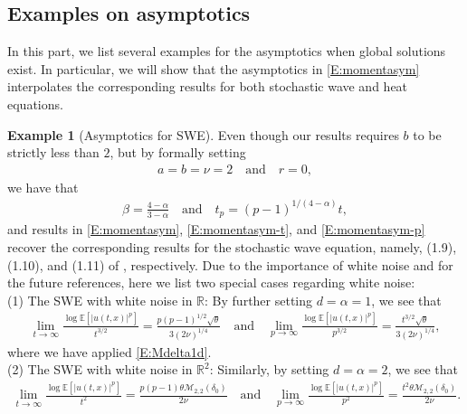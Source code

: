 \documentclass[a4paper,11pt]{article}
\numberwithin{equation}{section}
\numberwithin{equation}{section}
\theoremstyle{plain}
\theoremstyle{definition}
\newtheorem{example}[theorem]{Example}
\newcommand{\E}{\mathbb{E}}
\newcommand{\R}{\mathbb{R}}
\begin{document}
\subsection{Examples on asymptotics} \label{SS:EgAsym}

In this part, we list several examples for the asymptotics when global solutions exist. In
particular, we will show that the asymptotics in \eqref{E:momentasym} interpolates the corresponding
results for both stochastic wave and heat equations.

\begin{example}[Asymptotics for SWE] \label{Eg:AsymSWE}
  Even though our results requires $b$ to be strictly less than $2$, but by formally setting
  \begin{align*}
    a = b = \nu = 2 \quad \text{and} \quad r = 0,
  \end{align*}
  we have that
  \begin{align*}
    \beta = \frac{4-\alpha}{3-\alpha} \quad \text{and} \quad
    t_p   = (p-1)^{1/(4-\alpha)} t,
  \end{align*}
  and results in \eqref{E:momentasym}, \eqref{E:momentasym-t}, and \eqref{E:momentasym-p} recover
  the corresponding results for the stochastic wave equation, namely, (1.9), (1.10), and (1.11) of
  \cite{BCC21}, respectively.  Due to the importance of white noise and for the future references,
  here we list two special cases regarding white noise:\\

  \noindent(1) The SWE with white noise in $\R$: By further setting $d=\alpha=1$, we see that
  \begin{align} \label{E:AsymSWE-1d}
      \lim_{t \to \infty} \frac{\log \E\left[|u(t,x)|^p\right]}{t^{3/2}} =  \frac{p(p-1)^{1/2}\sqrt{\theta}}{3 (2\nu)^{1/4}}
      \quad \text{and} \quad
      \lim_{p \to \infty} \frac{\log \E\left[|u(t,x)|^p\right]}{p^{3/2}} = \frac{t^{3/2}\sqrt{\theta}}{3 (2\nu)^{1/4}},
  \end{align}
  where we have applied \eqref{E:Mdelta1d}.\\

  \noindent(2) The SWE with white noise in $\R^2$: Similarly, by setting $d=\alpha=2$, we see that
  \begin{align} \label{E:AsymSWE-2d}
      \lim_{t \to \infty} \frac{\log \E\left[|u(t,x)|^p\right]}{t^2} = \frac{p(p-1)\theta\mathcal{M}_{2,2}(\delta_0)}{2\nu}
      \quad \text{and} \quad
      \lim_{p \to \infty} \frac{\log \E\left[|u(t,x)|^p\right]}{p^2} = \frac{t^2\theta\mathcal{M}_{2,2}(\delta_0)}{2\nu}.
  \end{align}
\end{example}
\end{document}
